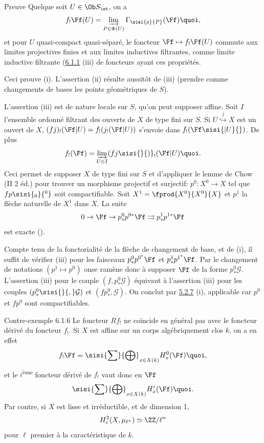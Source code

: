 \documentclass[10pt]{../fichiers-configuration-latex/smfart}
\begin{document}
\begin{enonce*}[remark]{Preuve}
Quel\pageoriginale que soit $U\in \Ob S_{\et}$, on a
\[
f_{!}\Ff (U)=\varinjlim_{P\in
\Phi(U)}\Gamma_{\sisi{p}{P}}(\Ff ){\quoi},
\]
et pour $U$ quasi-compact quasi-séparé, le foncteur
$\Ff \mapsto f_{!}\Ff (U)$ commute aux limites
projectives finies et aux limites inductives filtrantes, comme limite
inductive filtrante (\hyperref[XVII.prop6.1.1]{6.1.1}\sisi{)}{} (iii)\sisi{}{)} de foncteurs ayant ces propriétés.

Ceci prouve (i). L'assertion (ii) résulte aussitôt de (iii) (prendre
comme changements de bases les points géométriques de $S$).

L'assertion (iii) est de nature locale sur $S$, qu'on peut supposer
affine. Soit $I$ l'ensemble ordonné filtrant des ouverts de $X$ de
type fini sur $S$. Si
$U\overset{j}{\hookrightarrow}X$
est un ouvert de $X$,
$(fj)_{!}(\Ff |U)=f_{!}(j_{!}(\Ff |U))$ s'envoie dans
$f_{!}(\Ff\sisi{|U}{})$. De plus
$$
f_{!}(\Ff )=\varinjlim_{U\in I}
(fj\sisi{}{)}_{!}(\Ff |U){\quoi}.
$$
Ceci permet de supposer $X$ de type fini sur $S$ et d'appliquer le
lemme de Chow (\EGA II 2 éd.) pour trouver un morphisme projectif et
surjectif: $p^{0}:X^{0}\rightarrow X$ tel que $fp\sisi{_{0}}{^0}$
soit compactifiable. Soit $X^{1}=\fprod{X^{0}}{X^{0}}{X}$ et $p^{1}$
la flèche naturelle de $X^{1}$ dans $X$. La suite
$$
0\rightarrow \Ff \rightarrow
p^{0}_{\ast}p^{0{\ast}}\Ff \rightrightarrows
p^{1}_{\ast}p^{1{\ast}}\Ff
$$
est exacte ().

Compte tenu de la fonctorialité de la flèche de changement de base, et
de (i), il suffit de vérifier (iii) pour les faisceaux
$p^{0}_{\ast}p^{0^{\ast}}\Ff $ et
$p^{1}_{\ast}p^{1^{\ast}}\Ff $. Par le changement de notations
$(p^{1}\mapsto p^{0})$ on\pageoriginale se ramène donc à supposer
$\Ff $ de la forme $p^{0}_{\ast}\mathcal{G}$. L'assertion
(iii) pour le couple $(f,p^{0}_{\ast}\mathcal{G})$ équivaut à
l'assertion (iii) pour les couples $(p^{0}_{\ast}\sisi{}{,}\mathcal{G})$ et
$(fp^{0}_{\ast},\mathcal{G})$. On conclut par \hyperref[XVII.var5.2.7]{5.2.7} (i), applicable
car $p^{0}$ et $fp^{0}$ sont compactifiables.
\end{enonce*}

\begin{enonce*}[remark]{Contre-exemple 6.1.6}
Le foncteur $Rf_{!}$ ne coïncide en général pas avec le foncteur
dérivé du foncteur $f_{!}$. Si $X$ est affine sur un corps
algébriquement clos $k$, on a en effet
$$
f_{!}\Ff =\sisi{\sum}{\bigoplus}_{x\in X(k)}H^{0}_{x}(\Ff ){\quoi},
$$
et le $i$\textsuperscript{ème} foncteur dérivé de $f_{!}$ vaut donc en
$\Ff $
$$
\sisi{\sum}{\bigoplus}_{x\in X(k)}H^{i}_{x}(\Ff ){\quoi}.
$$
Par contre, si $X$ est lisse et irréductible, et de dimension 1,
$$
H^{2}_{c}(X,\mu_{\ell^{n}})\simeq \ZZ/\ell^{n}
$$
pour $\ell$ premier à la caractéristique de $k$.
\end{enonce*}
\end{document}
